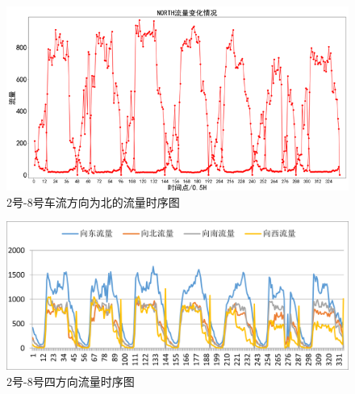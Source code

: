 \documentclass[UTF8]{article}
\begin{document}
        \begin{figure}[H]
            \includegraphics[width=\linewidth]{8.png}
            \caption{2号-8号车流方向为北的流量时序图}
        \end{figure}
        \begin{figure}[H]
            \includegraphics[width=\linewidth]{9.png}
            \caption{2号-8号四方向流量时序图}
        \end{figure}



                
                        



     
            

    


    
\end{document}
